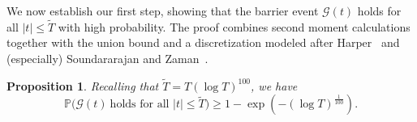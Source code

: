 \documentclass[12pt, notitlepage]{amsart}
\numberwithin{equation}{section}
\def\P{\mathbb P}
\def\TT{\widetilde{T}}
\newtheorem{proposition}[theorem]{Proposition}
\theoremstyle{remark}
\theoremstyle{definition}
\theoremstyle{remark}
\numberwithin{equation}{section}
\begin{document}
\vspace{12pt}

We now establish our first step, showing that the barrier event ${\mathcal G}(t)$ holds for all $|t|\le \TT$ with high probability.   The proof combines second moment calculations together with the union bound and a discretization modeled after Harper~\cite{HarperLow} and (especially) Soundararajan and Zaman~\cite{SZ}.


\begin{proposition} \label{prop3.3}  Recalling that $\TT = T(\log T)^{100}$, we have  
\begin{equation}\label{eqn: exceptprob}
\P\Big( \mathcal{G}(t)~\text{holds for all $|t|\le \TT$} \Big)  \ge 1 -\exp (-(\log T)^{\frac 1{100}}). 
\end{equation}
\end{proposition} 
\end{document}
